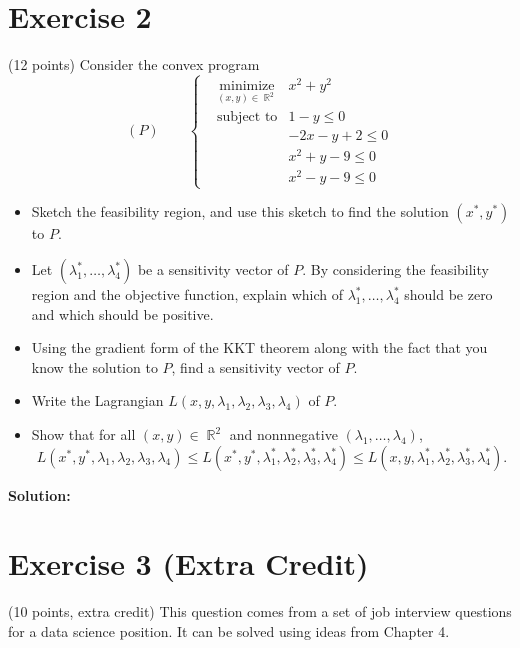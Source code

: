 \documentclass{article}
\DeclareMathOperator{\R}{\mathbb R}
\begin{document}
\section*{Exercise 2}
(12 points) Consider the convex program 
 \begin{equation*}
(P)\qquad\left\{\begin{aligned}
& \underset{  (x,y) \in \R^2}{\text{minimize}}
&  x^2 + y^2 \\
& \text{subject to} & 1-y \leq 0 \\
 && -2x-y +2 \leq 0 \\
 && x^2 + y - 9 \leq 0 \\
 && x^2 - y - 9 \leq 0
\end{aligned}\right.
\end{equation*}
\begin{itemize}
\item Sketch the feasibility region, and use this sketch to find the solution $(x^*,y^*)$ to $P$.
\item Let $(\lambda_1^*,\dots,\lambda_4^*)$ be a sensitivity vector of $P$. By considering the feasibility region and the objective function, explain which of $\lambda_1^*, \dots, \lambda_4^*$ should be zero and which should be positive.
\item Using the gradient form of the KKT theorem along with the fact that you know the solution to $P$, find a sensitivity vector of $P$.
\item Write the Lagrangian $L(x,y,\lambda_1, \lambda_2,\lambda_3,\lambda_4)$ of $P$.
\item Show that for all $(x,y) \in \R^2$ and nonnnegative $(\lambda_1,\dots,\lambda_4)$,
\[L(x^*,y^*,\lambda_1,\lambda_2,\lambda_3,\lambda_4) \leq L(x^*,y^*,\lambda_1^*,\lambda_2^*,\lambda_3^*,\lambda_4^*) \leq L(x,y,\lambda_1^*,\lambda_2^*,\lambda_3^*,\lambda_4^*).\]
\end{itemize}

\textbf{Solution:} \\


\newpage

\section*{Exercise 3 (Extra Credit)}
(10 points, extra credit)
This question comes from a set of job interview questions for a data science position. It can be solved using ideas from Chapter 4.
\end{document}
